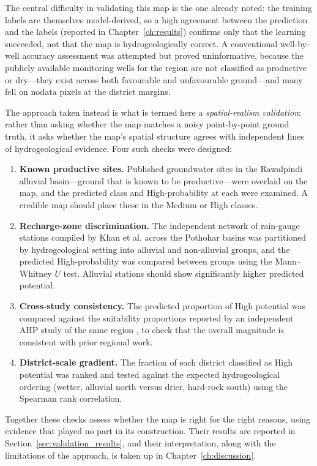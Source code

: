 The central difficulty in validating this map is the one already noted: the
training labels are themselves model-derived, so a high agreement between the
prediction and the labels (reported in Chapter~\ref{ch:results}) confirms only
that the learning succeeded, not that the map is hydrogeologically correct. A
conventional well-by-well accuracy assessment was attempted but proved
uninformative, because the publicly available monitoring wells for the region are
not classified as productive or dry---they exist across both favourable and
unfavourable ground---and many fell on nodata pixels at the district margins.

The approach taken instead is what is termed here a \emph{spatial-realism
validation}: rather than asking whether the map matches a noisy point-by-point
ground truth, it asks whether the map's spatial structure agrees with independent
lines of hydrogeological evidence. Four such checks were designed:

\begin{enumerate}
  \item \textbf{Known productive sites.} Published groundwater sites in the
        Rawalpindi alluvial basin---ground that is known to be productive---were
        overlaid on the map, and the predicted class and High-probability at each
        were examined. A credible map should place these in the Medium or High
        classes.
  \item \textbf{Recharge-zone discrimination.} The independent network of
        rain-gauge stations compiled by Khan et al. \cite{khan2023rainfallrunoff}
        across the Pothohar basins was partitioned by hydrogeological setting into
        alluvial and non-alluvial groups, and the predicted High-probability was
        compared between groups using the Mann--Whitney $U$ test. Alluvial
        stations should show significantly higher predicted potential.
  \item \textbf{Cross-study consistency.} The predicted proportion of High
        potential was compared against the suitability proportions reported by an
        independent AHP study of the same region \cite{hafeez2025rwh}, to check
        that the overall magnitude is consistent with prior regional work.
  \item \textbf{District-scale gradient.} The fraction of each district classified
        as High potential was ranked and tested against the expected
        hydrogeological ordering (wetter, alluvial north versus drier, hard-rock
        south) using the Spearman rank correlation.
\end{enumerate}

Together these checks assess whether the map is right for the right reasons,
using evidence that played no part in its construction. Their results are
reported in Section~\ref{sec:validation_results}, and their interpretation, along
with the limitations of the approach, is taken up in
Chapter~\ref{ch:discussion}.
